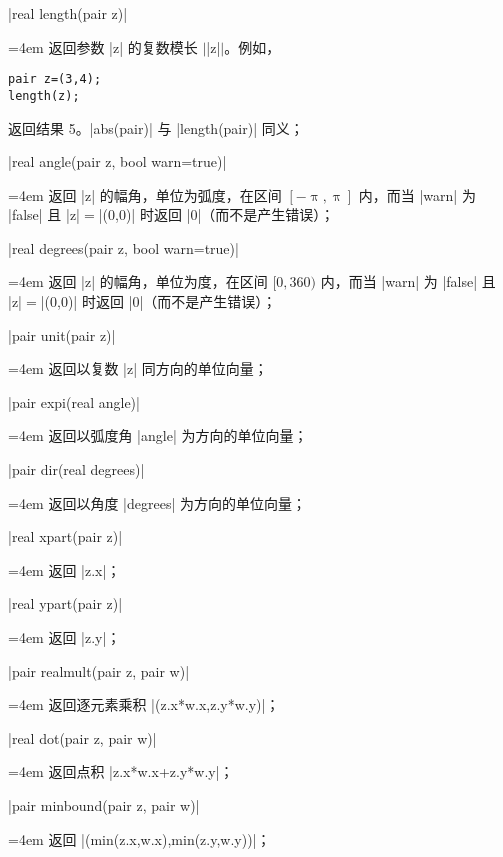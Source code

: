 \documentclass[nofonts,CJKnormalspaces]{ctexbook}[2009/05/20]
\makeatletter
\newenvironment{funclist}{\trivlist
  \parindent=0pt
\item[]
  \def\item{\medskip\par\leftskip=0pt}
  \def\go{\par\leftskip=4em}}
{\endtrivlist}
\newenvironment{typelist}{\itemize
  \let\old@item\@item
  \def\@item[##1]{\expandafter\old@item[\ttfamily\color{type!50!black}##1]}}
{\enditemize}
\makeatother
\begin{document}
\begin{typelist}
\begin{funclist}
\item |real length(pair z)| \go
  返回参数 |z| 的复数模长 $\vert$|z|$\vert$。例如，
\begin{lstlisting}
pair z=(3,4);
length(z);
\end{lstlisting}
  返回结果 5。|abs(pair)| 与 |length(pair)| 同义；

\item |real angle(pair z, bool warn=true)| \go
  返回 |z| 的幅角，单位为弧度，在区间 $[-\uppi, \uppi]$ 内，而当 |warn| 为
  |false| 且 |z|${}={}$|(0,0)| 时返回 |0|（而不是产生错误）；

\item |real degrees(pair z, bool warn=true)| \go
  返回 |z| 的幅角，单位为度，在区间 $[0,360)$ 内，而当 |warn| 为 |false| 且
  |z|${}={}$|(0,0)| 时返回 |0|（而不是产生错误）；

\item |pair unit(pair z)| \go
  返回以复数 |z| 同方向的单位向量；

\item |pair expi(real angle)| \go
  返回以弧度角 |angle| 为方向的单位向量；

\item |pair dir(real degrees)| \go
  返回以角度 |degrees| 为方向的单位向量；

\item |real xpart(pair z)| \go
  返回 |z.x|；

\item |real ypart(pair z)| \go
  返回 |z.y|；

\item |pair realmult(pair z, pair w)| \go
  返回逐元素乘积 |(z.x*w.x,z.y*w.y)|；

\item |real dot(pair z, pair w)| \go
  返回点积 |z.x*w.x+z.y*w.y|；

\item |pair minbound(pair z, pair w)| \go
  返回 |(min(z.x,w.x),min(z.y,w.y))|；


\end{funclist}
\end{typelist}
\end{document}
